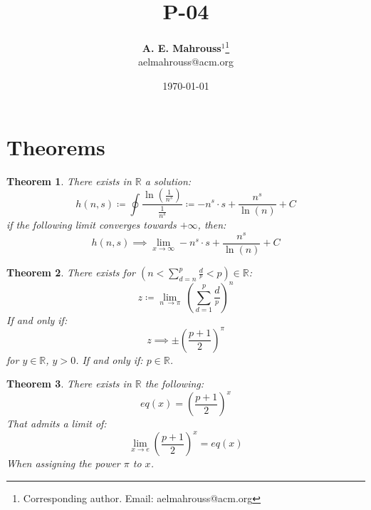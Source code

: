 \documentclass[10pt, twocolumn]{article}
\title{%
  \vspace{-1.5em}%
  \large\textbf{P-04}%
}
\author{%
  \textbf{A. E. Mahrouss}$^{1}$\thanks{Corresponding author. Email: aelmahrouss@acm.org}
  \\aelmahrouss@acm.org\\[0.4em]
}
\date{%
  \small \today
}
\theoremstyle{plain}
\newtheorem{theorem}{Theorem}[section]
\theoremstyle{definition}
\theoremstyle{remark}
\begin{document}

\twocolumn[{%
  \maketitle
  \vspace{-0.5em}
  \vspace{0.8em}
  \rule{\linewidth}{0.4pt}
  \vspace{1em}
}]


\section{Theorems}
\begin{theorem}
  There exists in $\mathbb{R}$ a solution:
  \begin{equation}
    h(n, s) \coloneqq \oint \frac{\ln(\frac{1}{n^s})}{\frac{1}{n^s}}  \coloneq -n^s \cdot s+\frac{n^s}{\ln \left(n\right)}+C
  \end{equation}
  if the following limit converges towards $+\infty$, then:
  \begin{equation}
    h(n, s) \implies \lim _{x\to \infty } -n^s \cdot s+\frac{n^s}{\ln \left(n\right)}+C
  \end{equation}
\end{theorem}

\begin{theorem}
  There exists for $(n < \sum_{d=n}^{p} \frac{d}{^p} < p) \in \mathbb{R}$:
  \begin{equation}
    z \coloneq \lim _{n\:\to \pi }\:(\sum_{d=1}^{p} \frac{d}{^p})^{n}
  \end{equation}
  If and only if:
  \begin{equation}
    z \implies \pm \left(\frac{p+1}{2}\right)^{\pi }
  \end{equation}
  for $y \in \mathbb{R}$, $y > 0$. If and only if: $p \in \mathbb{R}$.
\end{theorem}

\begin{theorem}
  There exists  in $\mathbb{R}$ the following:
  \begin{equation}
    eq(x) = \left(\frac{p+1}{2}\right)^{x}
  \end{equation}
  That admits a limit of:
  \begin{equation}
    \lim_{x \to e} \left(\frac{p+1}{2}\right)^{x } = eq(x)
  \end{equation}
  When assigning the power $\pi$ to $x$.
\end{theorem}
\end{document}
